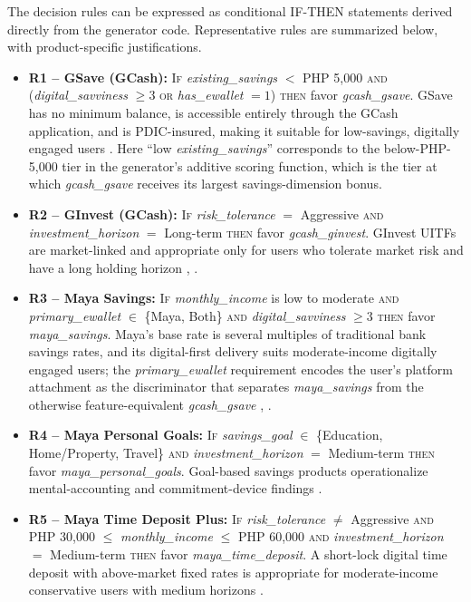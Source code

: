 \documentclass{icsthesis}
\begin{document}
\begin{mainmatter}
					The decision rules can be expressed as conditional IF-THEN statements derived directly from the generator code. Representative rules are summarized below, with product-specific justifications.
					\begin{itemize}
					    \item \textbf{R1 -- GSave (GCash):} \textsc{If} \emph{existing\_savings} $<$ PHP 5{,}000 \textsc{and} (\emph{digital\_savviness} $\geq 3$ \textsc{or} \emph{has\_ewallet} $= 1$) \textsc{then} favor \emph{gcash\_gsave}. GSave has no minimum balance, is accessible entirely through the GCash application, and is PDIC-insured, making it suitable for low-savings, digitally engaged users \cite{ref35}. Here ``low \emph{existing\_savings}'' corresponds to the below-PHP-5{,}000 tier in the generator's additive scoring function, which is the tier at which \emph{gcash\_gsave} receives its largest savings-dimension bonus.
					    \item \textbf{R2 -- GInvest (GCash):} \textsc{If} \emph{risk\_tolerance} $=$ Aggressive \textsc{and} \emph{investment\_horizon} $=$ Long-term \textsc{then} favor \emph{gcash\_ginvest}. GInvest UITFs are market-linked and appropriate only for users who tolerate market risk and have a long holding horizon \cite{ref62}, \cite{ref84}.
					    \item \textbf{R3 -- Maya Savings:} \textsc{If} \emph{monthly\_income} is low to moderate \textsc{and} \emph{primary\_ewallet} $\in$ \{Maya, Both\} \textsc{and} \emph{digital\_savviness} $\geq 3$ \textsc{then} favor \emph{maya\_savings}. Maya's base rate is several multiples of traditional bank savings rates, and its digital-first delivery suits moderate-income digitally engaged users; the \emph{primary\_ewallet} requirement encodes the user's platform attachment as the discriminator that separates \emph{maya\_savings} from the otherwise feature-equivalent \emph{gcash\_gsave} \cite{ref9}, \cite{ref35}.
					    \item \textbf{R4 -- Maya Personal Goals:} \textsc{If} \emph{savings\_goal} $\in$ \{Education, Home/Property, Travel\} \textsc{and} \emph{investment\_horizon} $=$ Medium-term \textsc{then} favor \emph{maya\_personal\_goals}. Goal-based savings products operationalize mental-accounting and commitment-device findings \cite{ref63}.
					    \item \textbf{R5 -- Maya Time Deposit Plus:} \textsc{If} \emph{risk\_tolerance} $\neq$ Aggressive \textsc{and} PHP 30{,}000 $\leq$ \emph{monthly\_income} $\leq$ PHP 60{,}000 \textsc{and} \emph{investment\_horizon} $=$ Medium-term \textsc{then} favor \emph{maya\_time\_deposit}. A short-lock digital time deposit with above-market fixed rates is appropriate for moderate-income conservative users with medium horizons \cite{ref35}.

\end{itemize}
\end{mainmatter}
\end{document}
